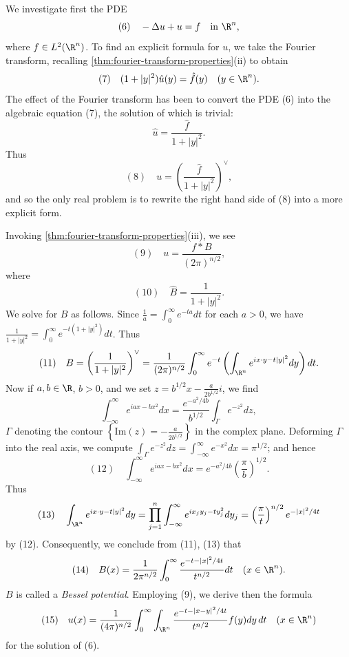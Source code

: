 \begin{example}
\label{ex:bessel-potentials}
We investigate first the PDE
$$(6) \quad -\Delta u + u = f \quad \text{in } \R^n,$$
where $f \in L^2(\R^n)$. To find an explicit formula for $u$, we take the Fourier transform, recalling \cref{thm:fourier-transform-properties}(ii) to obtain
$$(7) \quad (1 + |y|^2)\hat{u}(y) = \hat{f}(y) \quad (y \in \R^n).$$
The effect of the Fourier transform has been to convert the PDE (6) into the algebraic equation (7), the solution of which is trivial:
$$\hat{u} = \frac{\hat{f}}{1 + |y|^2}.$$
Thus
$$(8) \quad u = \left(\frac{\hat{f}}{1 + |y|^2}\right)^\vee,$$
and so the only real problem is to rewrite the right hand side of (8) into a more explicit form.

Invoking \cref{thm:fourier-transform-properties}(iii), we see
$$(9) \quad u = \frac{f * B}{(2\pi)^{n/2}},$$
where
$$(10) \quad \hat{B} = \frac{1}{1 + |y|^2}.$$
We solve for $B$ as follows. Since $\frac{1}{a} = \int_0^\infty e^{-ta} dt$ for each $a > 0$, we have $\frac{1}{1+|y|^2} = \int_0^\infty e^{-t(1+|y|^2)} dt$. Thus
$$(11) \quad B = \left(\frac{1}{1 + |y|^2}\right)^\vee = \frac{1}{(2\pi)^{n/2}} \int_0^\infty e^{-t} \left(\int_{\R^n} e^{ix \cdot y - t|y|^2} dy\right) dt.$$
Now if $a, b \in \R$, $b > 0$, and we set $z = b^{1/2}x - \frac{a}{2b^{1/2}}i$, we find
$$\int_{-\infty}^\infty e^{iax - bx^2} dx = \frac{e^{-a^2/4b}}{b^{1/2}} \int_\Gamma e^{-z^2} dz,$$
$\Gamma$ denoting the contour $\left\{\text{Im}(z) = -\frac{a}{2b^{1/2}}\right\}$ in the complex plane. Deforming $\Gamma$ into the real axis, we compute $\int_\Gamma e^{-z^2} dz = \int_{-\infty}^\infty e^{-x^2} dx = \pi^{1/2}$; and hence
$$(12) \quad \int_{-\infty}^\infty e^{iax - bx^2} dx = e^{-a^2/4b} \left(\frac{\pi}{b}\right)^{1/2}.$$
Thus
$$(13) \quad \int_{\R^n} e^{ix \cdot y - t|y|^2} dy = \prod_{j=1}^n \int_{-\infty}^\infty e^{ix_j y_j - ty_j^2} dy_j = \left(\frac{\pi}{t}\right)^{n/2} e^{-|x|^2/4t}$$
by (12). Consequently, we conclude from (11), (13) that
$$(14) \quad B(x) = \frac{1}{2\pi^{n/2}} \int_0^\infty \frac{e^{-t - |x|^2/4t}}{t^{n/2}} dt \quad (x \in \R^n).$$
$B$ is called a \textit{Bessel potential}. Employing (9), we derive then the formula
$$(15) \quad u(x) = \frac{1}{(4\pi)^{n/2}} \int_0^\infty \int_{\R^n} \frac{e^{-t - |x-y|^2/4t}}{t^{n/2}} f(y) dy\,dt \quad (x \in \R^n)$$
for the solution of (6).
\end{example}

